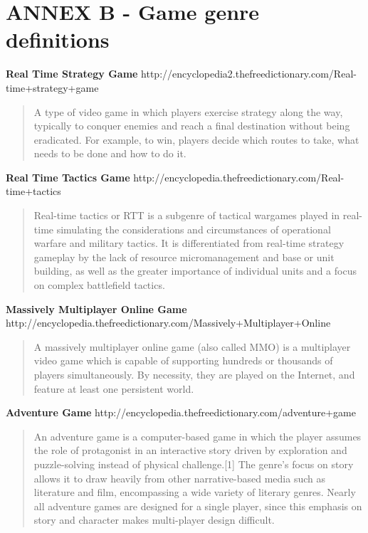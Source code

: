 \section{ANNEX B - Game genre definitions}


\textbf{Real Time Strategy Game}		
http://encyclopedia2.thefreedictionary.com/Real-time+strategy+game
\begin{quote}
A type of video game in which players exercise strategy along the way, typically
to conquer enemies and reach a final destination without being eradicated. For
example, to win, players decide which routes to take, what needs to be done and
how to do it.
\end{quote}

\textbf{Real Time Tactics Game}
	http://encyclopedia.thefreedictionary.com/Real-time+tactics
\begin{quote}
Real-time tactics or RTT is a subgenre of tactical wargames played in real-time
simulating the considerations and circumstances of operational warfare and
military tactics. It is differentiated from real-time strategy gameplay by the
lack of resource micromanagement and base or unit building, as well as the
greater importance of individual units and a focus on complex battlefield
tactics.
\end{quote}

\textbf{Massively Multiplayer Online Game}		
	http://encyclopedia.thefreedictionary.com/Massively+Multiplayer+Online
\begin{quote}
A massively multiplayer online game (also called MMO) is a multiplayer video
game which is capable of supporting hundreds or thousands of players
simultaneously. By necessity, they are played on the Internet, and feature at
least one persistent world.
\end{quote}
	
\textbf{Adventure Game}		
	http://encyclopedia.thefreedictionary.com/adventure+game
\begin{quote}
An adventure game is a computer-based game in which the player assumes the role
of protagonist in an interactive story driven by exploration and puzzle-solving
instead of physical challenge.[1] The genre's focus on story allows it to draw
heavily from other narrative-based media such as literature and film,
encompassing a wide variety of literary genres. Nearly all adventure games are
designed for a single player, since this emphasis on story and character makes
multi-player design difficult.
\end{quote}

